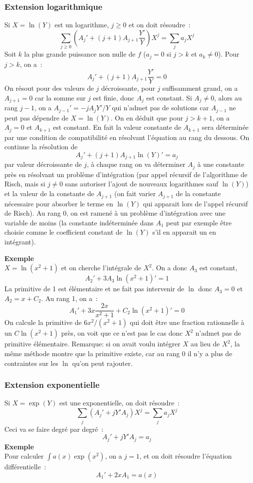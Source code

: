 \documentclass[a4paper,11pt]{article}
\begin{document}
\begin{giacjshere}
\subsubsection{Extension logarithmique}
Si $X=\ln(Y)$ est un logarithme, $j \geq 0$ et on doit résoudre~:
\[ \sum_{j\geq 0} (A_j'+(j+1)A_{j+1} \frac{Y'}{Y}) X^j = \sum_j a_j X^j \]
Soit $k$ la plus grande puissance non nulle de $f$ ($a_j=0$ 
si $j>k$ et $a_k\neq 0$). Pour $j>k$, on a~:
\[ A_j'+(j+1)A_{j+1} \frac{Y'}{Y}  =0 \]
On résout pour des valeurs de $j$ décroissante, pour $j$ suffisamment
grand, on a $A_{j+1}=0$ car la somme sur $j$ est finie, donc $A_j$
est constant. Si $A_j \neq 0$, alors au rang $j-1$, on a 
$A_{j-1} ' = -j A_j Y'/Y $ qui n'admet pas de solutions car 
$A_{j-1}$ ne peut pas dépendre de $X=\ln(Y)$. On en déduit que pour
$j>k+1$, on a $A_j=0$ et $A_{k+1}$ est constant. En fait la
valeur constante de $A_{k+1}$ sera déterminée par une condition
de compatibilité en résolvant l'équation au rang du dessous.
On continue la résolution de 
\[ A_j'+(j+1)A_{j+1} \ln(Y)'  = a_j \]
par valeur décroissante de $j$, à chaque
rang on va déterminer $A_j$ à une constante près en résolvant
un problème d'intégration (par appel récursif de l'algorithme
de Risch, mais si $j \neq 0$ sans autoriser l'ajout de nouveaux 
logarithmes sauf $\ln(Y)$)
et la valeur de la constante de $A_{j+1}$ (on fait varier $A_{j+1}$
de la constante nécessaire pour absorber le terme en $\ln(Y)$
qui apparait lors de l'appel récursif de Risch).
Au rang 0, on est ramené à un problème d'intégration avec
une variable de moins (la constante
indéterminée dans $A_1$ peut par exemple être choisie comme
le coefficient constant de $\ln(Y)$ s'il en apparait un en intégrant).

{\bf Exemple}\\
$X=\ln(x^2+1)$ et on cherche l'intégrale de $X^2$. On a donc $A_3$
est constant,
\[ A_2' + 3 A_3 \ln(x^2+1)' = 1\]
La primitive de 1 est élémentaire et ne fait pas intervenir de $\ln$
donc $A_3=0$ et $A_2=x+C_2$. Au rang 1, on a~:
\[A_1' + 3 x \frac{2x}{x^2+1} + C_2 \ln(x^2+1)' = 0\]
On calcule la primitive de $6x^2/(x^2+1)$ qui doit être une fraction
rationnelle à un $C\ln(x^2+1)$ près, on voit que ce n'est pas le cas
donc $X^2$ n'admet pas de primitive élémentaire.
Remarque: si on avait voulu intégrer $X$ au lieu de $X^2$, la même
méthode montre que la primitive existe, car au rang 0 il n'y
a plus de contraintes sur les $\ln$ qu'on peut rajouter.

\subsubsection{Extension exponentielle}
Si $X=\exp(Y)$ est une exponentielle, on doit résoudre~:
\[ \sum_{j} (A_j'+j Y'A_{j}) X^j = \sum_j a_j X^j \]
Ceci va se faire degré par degré~:
\begin{equation} \label{eq:rischdiffeq}
 A_j'+j Y' A_{j} = a_j
\end{equation}
{\bf Exemple}\\
Pour calculer $\int a(x) \exp(x^2)$, on a $j=1$, et on doit résoudre
l'équation différentielle~:
\[ A_1'+2xA_1= a(x)\]


\end{giacjshere}
\end{document}
